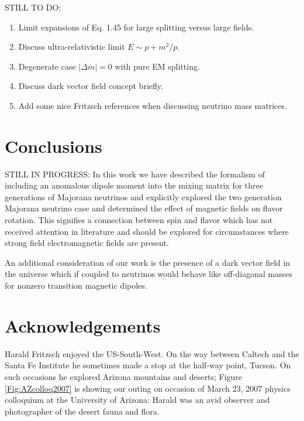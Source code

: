 \documentclass[addchapnum]{ws-rv961x669} %
\begin{document}
STILL TO DO:
\begin{enumerate}
    \item Limit expansions of Eq. 1.45 for large splitting versus large fields.
    \item Discuss ultra-relativistic limit $E\sim p+m^{2}/p$.
    \item Degenerate case $|\Delta m|=0$ with pure EM splitting.
    \item Discuss dark vector field concept briefly.
    \item Add some nice Fritzsch references when discussing neutrino mass matrices.
\end{enumerate}

\section{Conclusions}
STILL IN PROGRESS: In this work we have described the formalism of including an anomalous dipole moment into the mixing matrix for three generations of Majorana neutrinos and explicitly explored the two generation Majorana neutrino case and determined the effect of magnetic fields on flavor rotation. This signifies a connection between spin and flavor which has not received attention in literature and should be explored for circumstances where strong field electromagnetic fields are present.

An additional consideration of our work is the presence of a dark vector field in the universe which if coupled to neutrinos would behave like off-diagonal masses for nonzero transition magnetic dipoles.

\section*{Acknowledgements}
Harald Fritzsch enjoyed the US-South-West. On the way between Caltech and the Santa Fe Institute he sometimes made a stop at the half-way point, Tucson. On such occasions he explored Arizona mountains and  deserts; Figure\,\ref{Fig:AZcolloq2007} is showing our outing on occasion of March 23, 2007 physics colloquium at the University of Arizona: Harald was an avid observer and photographer of the desert fauna and flora. 
 
\end{document}
